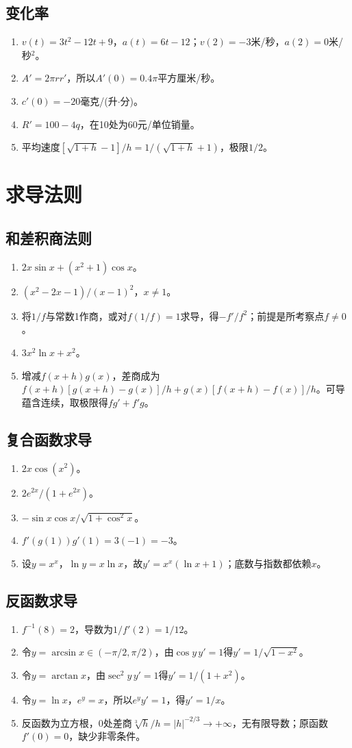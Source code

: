 \documentclass[11pt,a4paper,fontset=fandol]{ctexrep}
\begin{document}
\subsection{变化率}
\begin{enumerate}
\item $v(t)=3t^2-12t+9$，$a(t)=6t-12$；$v(2)=-3$米/秒，$a(2)=0$米/秒$^2$。
\item $A'=2\pi rr'$，所以$A'(0)=0.4\pi$平方厘米/秒。
\item $c'(0)=-20$毫克/(升$\cdot$分)。
\item $R'=100-4q$，在10处为60元/单位销量。
\item 平均速度$[\sqrt{1+h}-1]/h=1/(\sqrt{1+h}+1)$，极限$1/2$。
\end{enumerate}
\section{求导法则}
\subsection{和差积商法则}
\begin{enumerate}
\item $2x\sin x+(x^2+1)\cos x$。
\item $(x^2-2x-1)/(x-1)^2$，$x\ne1$。
\item 将$1/f$与常数1作商，或对$f(1/f)=1$求导，得$-f'/f^2$；前提是所考察点$f\ne0$。
\item $3x^2\ln x+x^2$。
\item 增减$f(x+h)g(x)$，差商成为$f(x+h)[g(x+h)-g(x)]/h+g(x)[f(x+h)-f(x)]/h$。可导蕴含连续，取极限得$fg'+f'g$。
\end{enumerate}
\subsection{复合函数求导}
\begin{enumerate}
\item $2x\cos(x^2)$。
\item $2e^{2x}/(1+e^{2x})$。
\item $-\sin x\cos x/\sqrt{1+\cos^2x}$。
\item $f'(g(1))g'(1)=3(-1)=-3$。
\item 设$y=x^x$，$\ln y=x\ln x$，故$y'=x^x(\ln x+1)$；底数与指数都依赖$x$。
\end{enumerate}
\subsection{反函数求导}
\begin{enumerate}
\item $f^{-1}(8)=2$，导数为$1/f'(2)=1/12$。
\item 令$y=\arcsin x\in(-\pi/2,\pi/2)$，由$\cos y\,y'=1$得$y'=1/\sqrt{1-x^2}$。
\item 令$y=\arctan x$，由$\sec^2y\,y'=1$得$y'=1/(1+x^2)$。
\item 令$y=\ln x$，$e^y=x$，所以$e^y y'=1$，得$y'=1/x$。
\item 反函数为立方根，0处差商$\sqrt[3]h/h=|h|^{-2/3}\to+\infty$，无有限导数；原函数$f'(0)=0$，缺少非零条件。
\end{enumerate}
\end{document}
